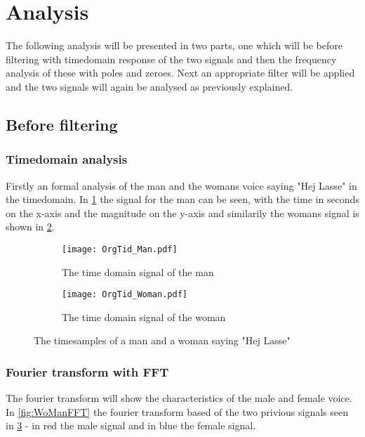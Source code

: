 
\section{Analysis}
\label{sec:analysis}
The following analysis will be presented in two parts, one which will be before filtering with timedomain response of the two signals and then the frequency analysis of these with poles and zeroes. Next an appropriate filter will be applied and the two signals will again be analysed as previously explained.

\subsection{Before filtering}

\subsubsection{Timedomain analysis}

Firstly an formal analysis of the man and the womans voice saying "Hej Lasse" in the timedomain. In \cref{fig:time_man} the signal for the man can be seen, with the time in seconds on the x-axis and the magnitude on the y-axis and similarily the womans signal is shown in \cref{fig:time_woman}.

\begin{figure}[h]
\centering
\begin{subfigure}{0.45\textwidth}
	\texttt{[image: OrgTid\_Man.pdf]}
	\caption{The time domain signal of the man}
	\label{fig:time_man}
\end{subfigure}
\quad
\begin{subfigure}{0.45\textwidth}
\texttt{[image: OrgTid\_Woman.pdf]}
\caption{The time domain signal of the woman}
\label{fig:time_woman}
\end{subfigure}
\caption{The timesamples of a man and a woman saying "Hej Lasse"}
\label{fig:time_WoMan}
\end{figure}

\subsubsection{Fourier transform with FFT}

The fourier transform will show the characteristics of the male and female voice. In \cref{fig:WoManFFT} the fourier transform based of the two privious signals seen in \cref{fig:time_WoMan} - in red the male signal and in blue the female signal.

